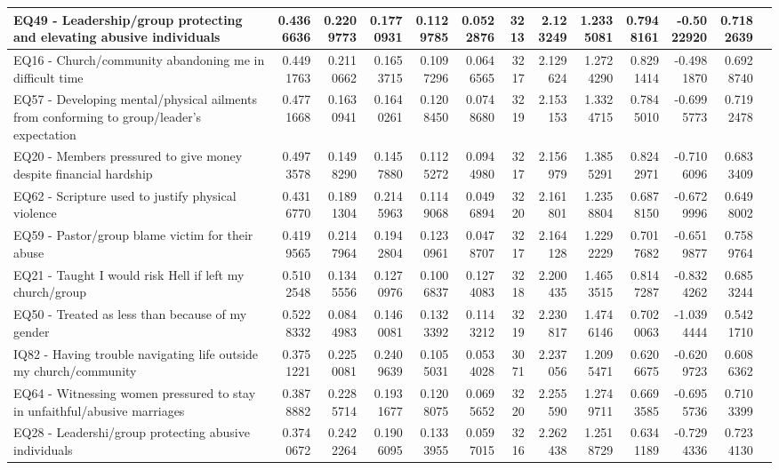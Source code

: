 \documentclass[
  letterpaper,
]{article}
\begin{document}
\begin{table}
\begin{tabular}{l|r|r|r|r|r|r|r|r|r|r|r|l}
EQ49 - Leadership/group protecting and elevating abusive individuals & 0.4366636 & 0.2209773 & 0.1770931 & 0.1129785 & 0.0522876 & 3213 & 2.123249 & 1.2335081 & 0.7948161 & -0.5022920 & 0.7182639 & \\
\hline
EQ16 - Church/community abandoning me in difficult time & 0.4491763 & 0.2110662 & 0.1653715 & 0.1097296 & 0.0646565 & 3217 & 2.129624 & 1.2724290 & 0.8291414 & -0.4981870 & 0.6928740 & \\
\hline
EQ57 - Developing mental/physical ailments from conforming to group/leader’s expectation & 0.4771668 & 0.1630941 & 0.1640261 & 0.1208450 & 0.0748680 & 3219 & 2.153153 & 1.3324715 & 0.7845010 & -0.6995773 & 0.7192478 & \\
\hline
EQ20 - Members pressured to give money despite financial hardship & 0.4973578 & 0.1498290 & 0.1457880 & 0.1125272 & 0.0944980 & 3217 & 2.156979 & 1.3855291 & 0.8242971 & -0.7106096 & 0.6833409 & \\
\hline
EQ62 - Scripture used to justify physical violence & 0.4316770 & 0.1891304 & 0.2145963 & 0.1149068 & 0.0496894 & 3220 & 2.161801 & 1.2358804 & 0.6878150 & -0.6729996 & 0.6498002 & \\
\hline
EQ59 - Pastor/group blame victim for their abuse & 0.4199565 & 0.2147964 & 0.1942804 & 0.1230961 & 0.0478707 & 3217 & 2.164128 & 1.2292229 & 0.7017682 & -0.6519877 & 0.7589764 & \\
\hline
EQ21 - Taught I would risk Hell if left my church/group & 0.5102548 & 0.1345556 & 0.1270976 & 0.1006837 & 0.1274083 & 3218 & 2.200435 & 1.4653515 & 0.8147287 & -0.8324262 & 0.6853244 & \\
\hline
EQ50 - Treated as less than because of my gender & 0.5228332 & 0.0844983 & 0.1460081 & 0.1323392 & 0.1143212 & 3219 & 2.230817 & 1.4746146 & 0.7020063 & -1.0394444 & 0.5421710 & \\
\hline
IQ82 - Having trouble navigating life outside my church/community & 0.3751221 & 0.2250081 & 0.2409639 & 0.1055031 & 0.0534028 & 3071 & 2.237056 & 1.2095471 & 0.6206675 & -0.6209723 & 0.6086362 & \\
\hline
EQ64 - Witnessing women pressured to stay in unfaithful/abusive marriages & 0.3878882 & 0.2285714 & 0.1931677 & 0.1208075 & 0.0695652 & 3220 & 2.255590 & 1.2749711 & 0.6693585 & -0.6955736 & 0.7103399 & \\
\hline
EQ28 - Leadershi/group protecting abusive individuals & 0.3740672 & 0.2422264 & 0.1906095 & 0.1333955 & 0.0597015 & 3216 & 2.262438 & 1.2518729 & 0.6341189 & -0.7294336 & 0.7234130 & \\

\end{tabular}
\end{table}
\end{document}
